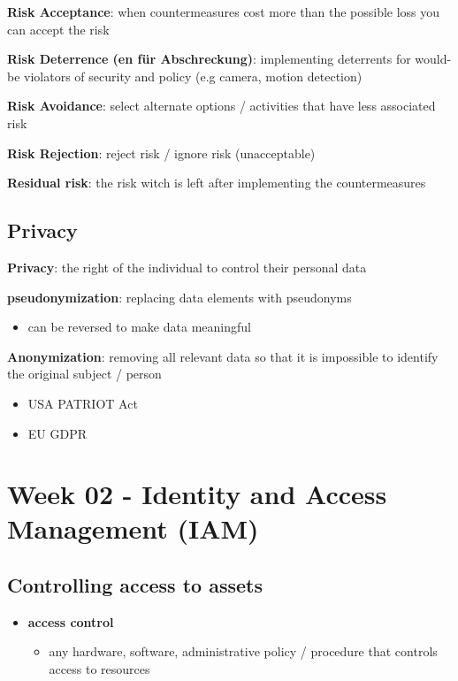 \documentclass[11pt,twoside,landscape]{article}
\begin{document}
\begin{multicols}{4}
\textbf{Risk Acceptance}: when countermeasures cost more than the possible loss you can accept the risk

\textbf{Risk Deterrence (en für Abschreckung)}: implementing deterrents for would-be violators of security and policy (e.g camera, motion detection)

\textbf{Risk Avoidance}: select alternate options / activities that have less associated risk

\textbf{Risk Rejection}: reject risk / ignore risk (unacceptable)

\textbf{Residual risk}: the risk witch is left after implementing the countermeasures

\subsection{Privacy}
\label{sec:org0c12114}
\textbf{Privacy}: the right of the individual to control their personal data

\textbf{pseudonymization}: replacing data elements with pseudonyms
\begin{itemize}
\item can be reversed to make data meaningful
\end{itemize}

\textbf{Anonymization}: removing all relevant data so that it is impossible to identify the original subject / person

\begin{itemize}
\item USA PATRIOT Act
\item EU GDPR
\end{itemize}

\section{Week 02 - Identity and Access Management (IAM)}
\label{sec:orgc12a3de}
\subsection{Controlling access to assets}
\label{sec:org05b6cc2}
\begin{itemize}
\item \textbf{access control}
\begin{itemize}
\item any hardware, software, administrative policy / procedure that controls access to resources
\end{itemize}


\end{itemize}
\end{multicols}
\end{document}
